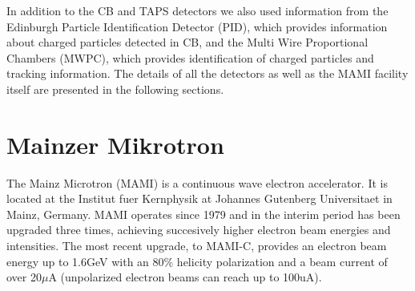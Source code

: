 In addition to the CB and TAPS detectors we also used information from  the Edinburgh Particle Identification Detector (PID), which provides information about charged particles detected in CB, and the Multi Wire Proportional Chambers (MWPC), which provides identification of charged particles and tracking information. The details of all the detectors as well as the MAMI facility itself are presented in the following sections.

\section{Mainzer Mikrotron}

\indent The Mainz Microtron (MAMI) is a continuous wave electron accelerator. It is located at the Institut fuer Kernphysik at Johannes Gutenberg Universitaet in Mainz, Germany. MAMI operates since 1979 and in the interim period has been upgraded three times, achieving succesively higher electron beam energies and intensities. The most recent upgrade, to MAMI-C, provides an  electron beam energy up to 1.6GeV with an 80\% helicity polarization and a beam current of over 20$\mu$A (unpolarized electron beams can reach up to 100uA).

